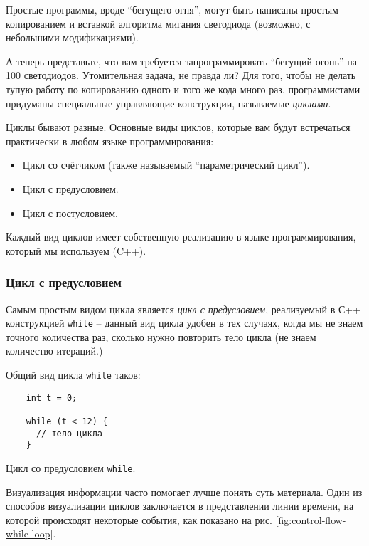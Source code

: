 \documentclass[../sparc.tex]{subfiles}
\begin{document}
Простые программы, вроде ``бегущего огня'', могут быть написаны простым
копированием и вставкой алгоритма мигания светодиода (возможно, с небольшими
модификациями).

А теперь представьте, что вам требуется запрограммировать ``бегущий огонь'' на
100 светодиодов. Утомительная задача, не правда ли? Для того, чтобы не делать
тупую работу по копированию одного и того же кода много раз, программистами
придуманы специальные управляющие конструкции, называемые \emph{циклами}.

Циклы бывают разные. Основные виды циклов, которые вам будут встречаться
практически в любом языке программирования:
\begin{itemize}
\item Цикл со счётчиком (также называемый ``параметрический цикл'').
\item Цикл с предусловием.
\item Цикл с постусловием.
\end{itemize}

Каждый вид циклов имеет собственную реализацию в языке программирования, который
мы используем (C++).

\subsubsection{Цикл с предусловием}

Самым простым видом цикла является \emph{цикл с предусловием}, реализуемый в С++
конструкцией \texttt{while} -- данный вид цикла удобен в тех случаях, когда мы не
знаем точного количества раз, сколько нужно повторить тело цикла (не знаем
количество итераций.)

Общий вид цикла \texttt{while} таков:

\begin{listing}[ht]
  \begin{verbatim}
    int t = 0;

    while (t < 12) {
      // тело цикла
    }
  \end{verbatim}
  \label{listing:dialogues-with-computer-while}
  \caption{Цикл со предусловием \texttt{while}.}
\end{listing}

Визуализация информации часто помогает лучше понять суть материала. Один из
способов визуализации циклов заключается в представлении линии времени, на
которой происходят некоторые события, как показано на рис.
\ref{fig:control-flow-while-loop}.
\end{document}
